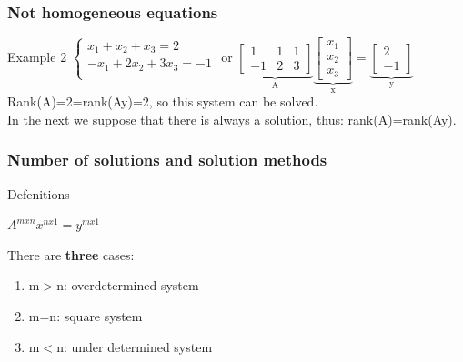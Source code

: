 \begin{frame}
	\frametitle{Not homogeneous equations}
	\begin{block}{Example 2}
		$\begin{cases}
		x_1+x_2+x_3=2\\
		-x_1+2x_2+3x_3=-1\\
		\end{cases}$ or $\underbrace{\begin{bmatrix}
		1 & 1 & 1 \\
		-1 & 2 & 3 \end{bmatrix}}_\text{A} \underbrace{\begin{bmatrix}
		x_1\\
		x_2\\
		x_3
		\end{bmatrix}}_\text{x}=\underbrace{\begin{bmatrix}	2\\-1
		\end{bmatrix}}_\text{y}$\\
		Rank(A)=2=rank(Ay)=2, so this system can be solved.\\
		\vspace{4mm}
		In the next we suppose that there is always a solution, thus: rank(A)=rank(Ay).
	\end{block}
\end{frame}

\begin{frame}
	\frametitle{Number of solutions and solution methods}
	\begin{block}{Defenitions}
		\begin{center}
			$A^{mxn}x^{nx1}=y^{mx1}$
		\end{center}
		There are \textbf{three} cases:
		\begin{enumerate}
			\item m$>$n: overdetermined system 
			\item m=n: square system
			\item m$<$n: under determined system
		\end{enumerate}
	\end{block}
\end{frame}

